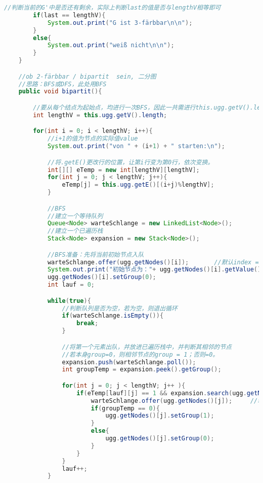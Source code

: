 \begin{lstlisting}[language = java]
        //判断当前的G'中是否还有剩余，实际上判断last的值是否与lengthV相等即可
        if(last == lengthV){
            System.out.print("G ist 3-färbbar\n\n");
        }
        else{
            System.out.print("weiß nicht\n\n");
        }
    }

    //ob 2-färbbar / bipartit  sein, 二分图
    //思路：BFS或DFS，此处用BFS
    public void bipartit(){

        //要从每个结点为起始点，均进行一次BFS，因此一共需进行this.ugg.getV().length次。
        int lengthV = this.ugg.getV().length;

        for(int i = 0; i < lengthV; i++){
            //i+1的值为节点的实际值value
            System.out.print("von " + (i+1) + " starten:\n");

            //将.getE()更改行的位置，让第i行变为第0行，依次变换。
            int[][] eTemp = new int[lengthV][lengthV];
            for(int j = 0; j < lengthV; j++){
                eTemp[j] = this.ugg.getE()[(i+j)%lengthV];
            }

            //BFS
            //建立一个等待队列
            Queue<Node> warteSchlange = new LinkedList<Node>();
            //建立一个已遍历栈
            Stack<Node> expansion = new Stack<Node>();

            //BFS准备：先将当前初始节点入队
            warteSchlange.offer(ugg.getNodes()[i]);       //默认index = value - 1
            System.out.print("初始节点为："+ ugg.getNodes()[i].getValue() + "\n");
            ugg.getNodes()[i].setGroup(0);
            int lauf = 0;

            while(true){
                //判断队列是否为空，若为空，则退出循环
                if(warteSchlange.isEmpty()){
                    break;
                }

                //将第一个元素出队，并放进已遍历栈中，并判断其相邻的节点
                //若本身group=0，则相邻节点的group = 1；否则=0。
                expansion.push(warteSchlange.poll());
                int groupTemp = expansion.peek().getGroup();

                for(int j = 0; j < lengthV; j++ ){
                    if(eTemp[lauf][j] == 1 && expansion.search(ugg.getNodes()[j]) == -1){
                        warteSchlange.offer(ugg.getNodes()[j]);     //若有边，则入队
                        if(groupTemp == 0){
                            ugg.getNodes()[j].setGroup(1);
                        }
                        else{
                            ugg.getNodes()[j].setGroup(0);
                        }
                    }
                }
                lauf++;
            }


\end{lstlisting}
